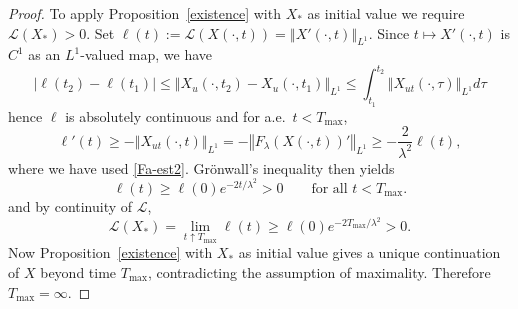 \documentclass[a4paper,11pt]{amsart}
\theoremstyle{definition}\newtheorem*{definition}{Definition}
\theoremstyle{definition} \newtheorem{proposition}[theorem]{Proposition}
\theoremstyle{definition}\newtheorem{lemma}[theorem]{Lemma}
\theoremstyle{definition}\newtheorem{corollary}[theorem]{Corollary}
\theoremstyle{definition}\newtheorem{example}{Example}
\theoremstyle{remark}\newtheorem*{remark}{Remark}
\def\R{\mathbb{R}}
\def\S{\mathbb{S}}
\newcommand{\norm}[1]{{\left \Vert {#1}\right \Vert}}
\def\length{\mathcal L}
\begin{document}
\begin{proof}
To apply Proposition~\ref{existence} with $X_*$ as initial value we require $\length(X_*)>0$.
Set $\ell(t):=\length(X(\cdot,t))=\norm{X'(\cdot,t)}_{L^1}$. 
Since $t\mapsto X'(\cdot,t)$ is $C^1$ as an $L^1$-valued map, we have
\[
|\ell(t_2)-\ell(t_1)|\leq \norm{X_u(\cdot,t_2)-X_u(\cdot,t_1)}_{L^1}\leq \int_{t_1}^{t_2}\norm{X_{ut}(\cdot, \tau)}_{L^1}d\tau
\]
hence $\ell$ is absolutely continuous and for a.e.\ $t<T_{\max}$,
\[
\ell'(t)\ge -\norm{X_{ut}(\cdot,t)}_{L^1}
=-\norm{F_\lambda(X(\cdot,t))'}_{L^1}
\ge -\frac{2}{\lambda^2}\ell(t),
\]
where we have used \eqref{Fa-est2}. Gr\"onwall's inequality then yields
\begin{equation}\label{lengthlowerbound}
\ell(t)\ge \ell(0)e^{-2t/\lambda^2}>0
\qquad\text{for all }t<T_{\max}.
\end{equation}
and by continuity of $\length$,
\[
\length(X_*)=\lim_{t\uparrow T_{\max}}\ell(t)\ge \ell(0)e^{-2T_{\max}/\lambda^2}>0.
\]
Now Proposition~\ref{existence} with $X_*$ as initial value gives a unique continuation of $X$ beyond time $T_{\max}$, contradicting the assumption of maximality. Therefore $T_{\max}=\infty$.
\end{proof}
\end{document}
